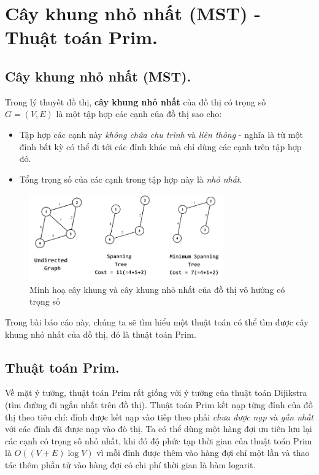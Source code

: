 \documentclass[a4paper, 11pt]{article}
\begin{document}
\clearpage
\section{Cây khung nhỏ nhất (MST) - Thuật toán Prim.}
\subsection{Cây khung nhỏ nhất (MST).}
Trong lý thuyết đồ thị, \textbf{cây khung nhỏ nhất} của đồ thị có trọng số $G = (V, E)$ là một tập hợp các cạnh của đồ thị sao cho:
\begin{itemize}
  \item Tập hợp các cạnh này \textit{không chứa chu trình} và \textit{liên thông} - nghĩa là từ một đỉnh bất kỳ có thể đi tới các đỉnh khác mà chỉ dùng các cạnh trên tập hợp đó.
  \item Tổng trọng số của các cạnh trong tập hợp này là \textit{nhỏ nhất}.
\end{itemize}

\begin{figure}[h]
  \centering
  \includegraphics[width=0.75\textwidth, height=0.75\textheight,keepaspectratio]{st_mst.png}
  \caption{Minh hoạ cây khung và cây khung nhỏ nhất của đồ thị vô hướng có trọng số}
\end{figure}

Trong bài báo cáo này, chúng ta sẽ tìm hiểu một thuật toán có thể tìm được cây khung nhỏ nhất của đồ thị, đó là thuật toán Prim.

\subsection{Thuật toán Prim.}
Về mặt ý tưởng, thuật toán Prim rất giống với ý tưởng của thuật toán Dijikstra (tìm đường đi ngắn nhất trên đồ thị). Thuật toán Prim kết nạp từng đỉnh của đồ thị theo tiêu chí: đỉnh được kết nạp vào tiếp theo phải \textit{chưa được nạp} và \textit{gần nhất} với các đỉnh đã được nạp vào đò thị. Ta có thể dùng một hàng đợi ưu tiên lưu lại các cạnh có trọng số nhỏ nhất, khi đó độ phức tạp thời gian của thuật toán Prim là $O((V + E) \log V)$ vì mỗi đỉnh được thêm vào hàng đợi chỉ một lần và thao tác thêm phần tử vào hàng đợi có chi phí thời gian là hàm logarit.
\end{document}
